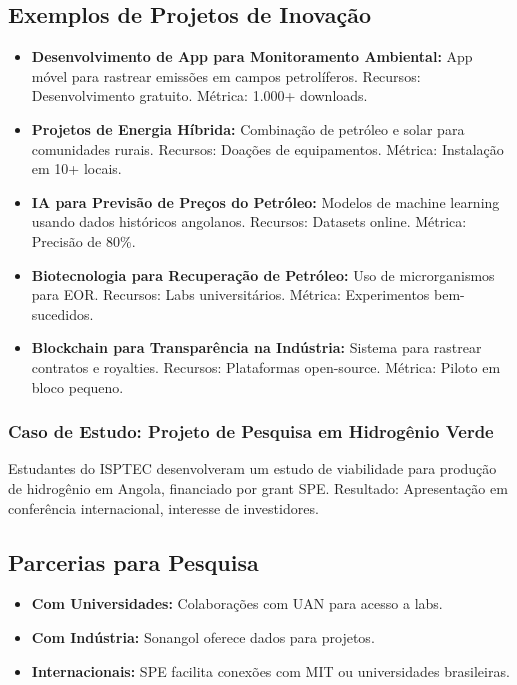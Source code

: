 \documentclass[12pt]{article}
\begin{document}
\subsection{Exemplos de Projetos de Inovação}
\begin{itemize}
    \item \textbf{Desenvolvimento de App para Monitoramento Ambiental:} App móvel para rastrear emissões em campos petrolíferos. Recursos: Desenvolvimento gratuito. Métrica: 1.000+ downloads.
    \item \textbf{Projetos de Energia Híbrida:} Combinação de petróleo e solar para comunidades rurais. Recursos: Doações de equipamentos. Métrica: Instalação em 10+ locais.
    \item \textbf{IA para Previsão de Preços do Petróleo:} Modelos de machine learning usando dados históricos angolanos. Recursos: Datasets online. Métrica: Precisão de 80\%.
    \item \textbf{Biotecnologia para Recuperação de Petróleo:} Uso de microrganismos para EOR. Recursos: Labs universitários. Métrica: Experimentos bem-sucedidos.
    \item \textbf{Blockchain para Transparência na Indústria:} Sistema para rastrear contratos e royalties. Recursos: Plataformas open-source. Métrica: Piloto em bloco pequeno.
\end{itemize}

\subsubsection{Caso de Estudo: Projeto de Pesquisa em Hidrogênio Verde}
Estudantes do ISPTEC desenvolveram um estudo de viabilidade para produção de hidrogênio em Angola, financiado por grant SPE. Resultado: Apresentação em conferência internacional, interesse de investidores.

\subsection{Parcerias para Pesquisa}
\begin{itemize}
    \item \textbf{Com Universidades:} Colaborações com UAN para acesso a labs.
    \item \textbf{Com Indústria:} Sonangol oferece dados para projetos.
    \item \textbf{Internacionais:} SPE facilita conexões com MIT ou universidades brasileiras.
\end{itemize}
\end{document}
